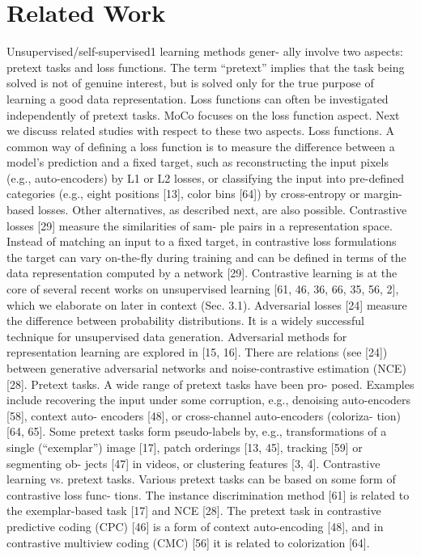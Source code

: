 \documentclass[10pt,twocolumn]{article}  %
\begin{document}
\section{Related Work}
Unsupervised/self-supervised1 learning methods gener-
ally involve two aspects: pretext tasks and loss functions.
The term “pretext” implies that the task being solved is not
of genuine interest, but is solved only for the true purpose
of learning a good data representation. Loss functions can
often be investigated independently of pretext tasks. MoCo
focuses on the loss function aspect. Next we discuss related
studies with respect to these two aspects.
Loss functions. A common way of deﬁning a loss function
is to measure the difference between a model’s prediction
and a ﬁxed target, such as reconstructing the input pixels
(e.g., auto-encoders) by L1 or L2 losses, or classifying the
input into pre-deﬁned categories (e.g., eight positions [13],
color bins [64]) by cross-entropy or margin-based losses.
Other alternatives, as described next, are also possible.
Contrastive losses [29] measure the similarities of sam-
ple pairs in a representation space. Instead of matching an
input to a ﬁxed target, in contrastive loss formulations the
target can vary on-the-ﬂy during training and can be deﬁned
in terms of the data representation computed by a network
[29]. Contrastive learning is at the core of several recent
works on unsupervised learning [61, 46, 36, 66, 35, 56, 2],
which we elaborate on later in context (Sec. 3.1).
Adversarial losses [24] measure the difference between
probability distributions. It is a widely successful technique
for unsupervised data generation. Adversarial methods for
representation learning are explored in [15, 16]. There are
relations (see [24]) between generative adversarial networks
and noise-contrastive estimation (NCE) [28].
Pretext tasks. A wide range of pretext tasks have been pro-
posed. Examples include recovering the input under some
corruption, e.g., denoising auto-encoders [58], context auto-
encoders [48], or cross-channel auto-encoders (coloriza-
tion) [64, 65]. Some pretext tasks form pseudo-labels by,
e.g., transformations of a single (“exemplar”) image [17],
patch orderings [13, 45], tracking [59] or segmenting ob-
jects [47] in videos, or clustering features [3, 4].
Contrastive learning vs. pretext tasks. Various pretext
tasks can be based on some form of contrastive loss func-
tions. The instance discrimination method [61] is related
to the exemplar-based task [17] and NCE [28]. The pretext
task in contrastive predictive coding (CPC) [46] is a form
of context auto-encoding [48], and in contrastive multiview
coding (CMC) [56] it is related to colorization [64].
\end{document}
